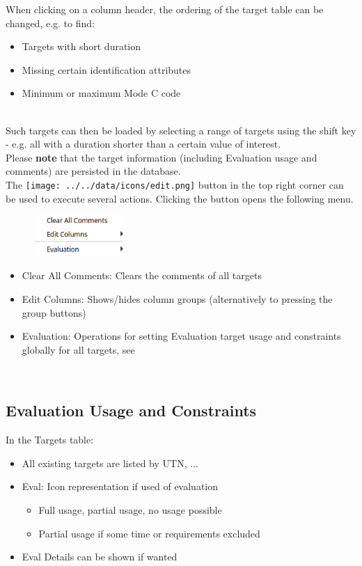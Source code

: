 When clicking on a column header, the ordering of the target table can be changed, e.g. to find:

\begin{itemize}  
\item Targets with short duration
\item Missing certain identification attributes
\item Minimum or maximum Mode C code
\end{itemize}
\ \\

Such targets can then be loaded by selecting a range of targets using the shift key - e.g. all with a duration shorter than a certain value of interest. \\

Please \textbf{note} that the target information (including Evaluation usage and comments) are persisted in the database. \\

The \texttt{[image: ../../data/icons/edit.png]} button in the top right corner can be used to execute several actions.
Clicking the button opens the following menu.

\begin{figure}[H]
    \center
    \includegraphics[width=3.5cm,frame]{figures/ui_targets_config.png}
\end{figure}

\begin{itemize}
  \item Clear All Comments: Clears the comments of all targets
  \item Edit Columns: Shows/hides column groups (alternatively to pressing the group buttons)
  \item Evaluation: Operations for setting Evaluation target usage and constraints globally for all targets, see 
 \end{itemize} 
 \  \\

\subsection{Evaluation Usage and Constraints}
\label{sec:ui_eval_usage}

In the Targets table:
\begin{itemize}
  \item All existing targets are listed by UTN, ...
  \item Eval: Icon representation if used of evaluation
  \begin{itemize}
  \item Full usage, partial usage, no usage possible
  \item Partial usage if some time or requirements excluded
 \end{itemize} 
 \item Eval Details can be shown if wanted
 \end{itemize} 
 \  \\

